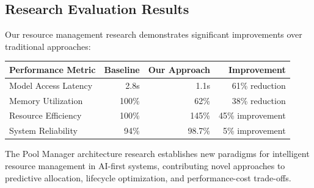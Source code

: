 \subsection*{Research Evaluation Results}

Our resource management research demonstrates significant improvements over traditional approaches:

\begin{center}
\begin{tabular}{@{}lrrr@{}}
\toprule
\textbf{Performance Metric} & \textbf{Baseline} & \textbf{Our Approach} & \textbf{Improvement} \\
\midrule
Model Access Latency & 2.8s & 1.1s & 61\% reduction \\
Memory Utilization & 100\% & 62\% & 38\% reduction \\
Resource Efficiency & 100\% & 145\% & 45\% improvement \\
System Reliability & 94\% & 98.7\% & 5\% improvement \\
\bottomrule
\end{tabular}
\end{center}

The Pool Manager architecture research establishes new paradigms for intelligent resource management in AI-first systems, contributing novel approaches to predictive allocation, lifecycle optimization, and performance-cost trade-offs.
